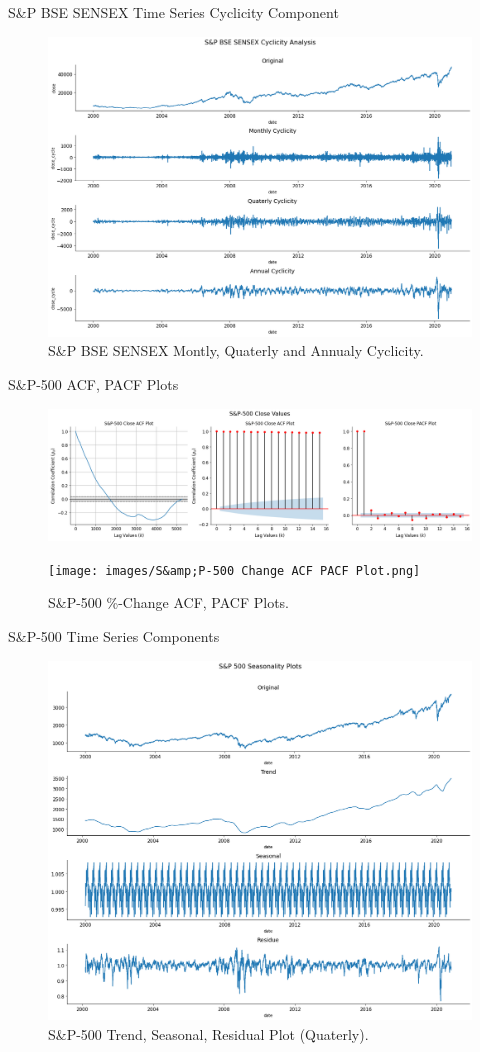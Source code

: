 \documentclass{beamer}
\begin{document}
\begin{frame}{S\&P BSE SENSEX Time Series Cyclicity Component}
	\begin{figure}
		\centering
		\includegraphics[width = 0.80 \textwidth]{images/SENSEX Cyclicity Plot.png}
		\caption{S\&P BSE SENSEX Montly, Quaterly and Annualy Cyclicity.}
		\label{fig:my_label}
	\end{figure}
\end{frame}

\begin{frame}{S\&P-500 ACF, PACF Plots}
	\begin{figure}
		\centering
		\includegraphics[width = 0.80 \textwidth]{images/S&P-500 ACF, PACF Plots.png}
		\caption{S\&P-500 ACF, PACF Plots.}
		\label{fig:my_label}
		\pause
		\texttt{[image: images/S\&amp;P-500 Change ACF PACF Plot.png]}
		\caption{S\&P-500 \%-Change ACF, PACF Plots.}
		\label{fig:my_label}
	\end{figure}
\end{frame}

\begin{frame}{S\&P-500 Time Series Components}
	\begin{figure}
		\centering
		\includegraphics[width = 0.70 \textwidth]{images/S&P-500 Seasonal Decompose Plot.png}
		\caption{S\&P-500 Trend, Seasonal, Residual Plot (Quaterly).}
		\label{fig:my_label}
	\end{figure}
\end{frame}
\end{document}
